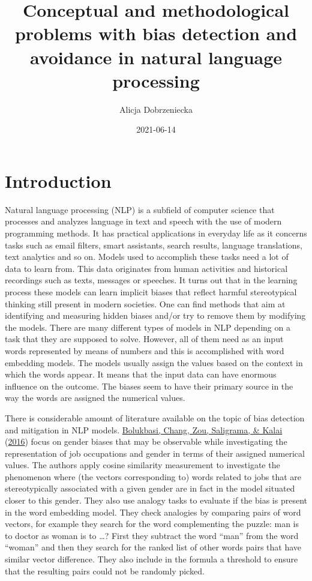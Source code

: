\documentclass[
  12pt,
]{book}
\title{Conceptual and methodological problems with bias detection and avoidance in natural language processing}
\author{Alicja Dobrzeniecka}
\date{2021-06-14}
\begin{document}
\maketitle

{
\setcounter{tocdepth}{5}
\tableofcontents
}
\hypertarget{introduction}{%
\chapter{Introduction}\label{introduction}}

Natural language processing (NLP) is a subfield of computer science that processes and analyzes language in text and speech with the use of modern programming methods. It has practical applications in everyday life as it concerns tasks such as email filters, smart assistants, search results, language translations, text analytics and so on. Models used to accomplish these tasks need a lot of data to learn from. This data originates from human activities and historical recordings such as texts, messages or speeches. It turns out that in the learning process these models can learn implicit biases that reflect harmful stereotypical thinking still present in modern societies. One can find methods that aim at identifying and measuring hidden biases and/or try to remove them by modifying the models. There are many different types of models in NLP depending on a task that they are supposed to solve. However, all of them need as an input words represented by means of numbers and this is accomplished with word embedding models. The models usually assign the values based on the context in which the words appear. It means that the input data can have enormous influence on the outcome. The biases seem to have their primary source in the way the words are assigned the numerical values.

There is considerable amount of literature available on the topic of bias detection and mitigation in NLP models. \protect\hyperlink{ref-Bolukbasi2016Man}{Bolukbasi, Chang, Zou, Saligrama, \& Kalai} (\protect\hyperlink{ref-Bolukbasi2016Man}{2016}) focus on gender biases that may be observable while investigating the representation of job occupations and gender in terms of their assigned numerical
values. The authors apply cosine similarity measurement to investigate the phenomenon where (the vectors corresponding to) words related to jobs that are stereotypically associated with a given gender are in fact in the model situated closer to this gender.
They also use analogy tasks to evaluate if the bias is present in the word embedding model. They check analogies by comparing pairs of word vectors, for example they search for the word complementing the puzzle: man is to doctor as woman is to \ldots? First they subtract the word ``man'' from the word ``woman'' and then
they search for the ranked list of other words pairs that have similar vector difference. They also include in the formula a threshold to ensure that the resulting pairs could not be randomly picked.
\end{document}
